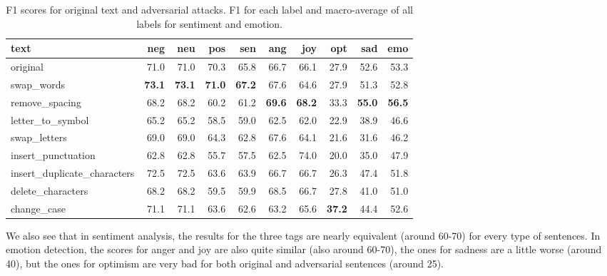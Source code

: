 \documentclass[11pt,a4paper]{article}
\begin{document}
\begin{table}[ht]
\centering
\begin{tabular}{l|rrr|r|rrrr|r}
\toprule
                       text &  neg &  neu &  pos &  sen &  ang &  joy &  opt &  sad &  emo \\
\midrule
                       original &      71.0 &     71.0 &      70.3 &       65.8 &   66.7 & 66.1 &      27.9 &     52.6 &     53.3 \\
                 swap\_words &      \textbf{73.1} &     \textbf{73.1} &      \textbf{71.0} &       \textbf{67.2} &   67.6 & 64.6 &      27.9 &     51.3 &     52.8 \\
             remove\_spacing &      68.2 &     68.2 &      60.2 &       61.2 &   \textbf{69.6} & \textbf{68.2} &      33.3 &     \textbf{55.0} &     \textbf{56.5} \\
           letter\_to\_symbol &      65.2 &     65.2 &      58.5 &       59.0 &   62.5 & 62.0 &      22.9 &     38.9 &     46.6 \\
               swap\_letters &      69.0 &     69.0 &      64.3 &       62.8 &   67.6 & 64.1 &      21.6 &     31.6 &     46.2 \\
         insert\_punctuation &      62.8 &     62.8 &      55.7 &       57.5 &   62.5 & 74.0 &      20.0 &     35.0 &     47.9 \\
insert\_duplicate\_characters &      72.5 &     72.5 &      63.6 &       63.9 &   66.7 & 66.7 &      26.3 &     47.4 &     51.8 \\
          delete\_characters &      68.2 &     68.2 &      59.5 &       59.9 &   68.5 & 66.7 &      27.8 &     41.0 &     51.0 \\
                change\_case &      71.1 &     71.1 &      63.6 &       62.6 &   63.2 & 65.6 &      \textbf{37.2} &     44.4 &     52.6 \\
\bottomrule
\end{tabular}
\caption{F1 scores for original text and adversarial attacks. F1 for each label and macro-average of all labels for sentiment and emotion.}
\label{tab:f1_scores}
\end{table}

We also see that in sentiment analysis, the results for the three tags are nearly equivalent (around 60-70) for every type of sentences. In emotion detection, the scores for anger and joy are also quite similar (also around 60-70), the ones for sadness are a little worse (around 40), but the ones for optimism are very bad for both original and adversarial sentences (around 25).
\end{document}
